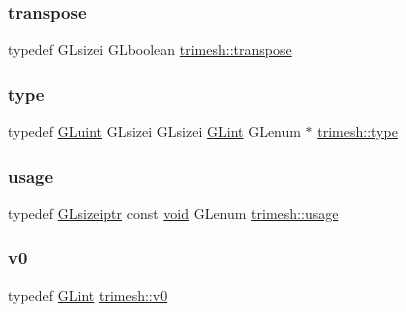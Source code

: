 \subsubsection{\texorpdfstring{transpose}{transpose}}
{\footnotesize\ttfamily typedef G\+Lsizei G\+Lboolean \hyperlink{namespacetrimesh_af31d9992cd459bbcf8e2705cb9b541f4}{trimesh\+::transpose}}

\mbox{\label{namespacetrimesh_aa726c5bf9cff74a26269e8d258ae9e3d}} 
\subsubsection{\texorpdfstring{type}{type}}
{\footnotesize\ttfamily typedef \hyperlink{namespacetrimesh_ad2289423ef47b393854afc30451d433b}{G\+Luint} G\+Lsizei G\+Lsizei \hyperlink{namespacetrimesh_aeccc290e30b317c861fb146956528187}{G\+Lint} G\+Lenum $\ast$ \hyperlink{namespacetrimesh_aa726c5bf9cff74a26269e8d258ae9e3d}{trimesh\+::type}}

\mbox{\label{namespacetrimesh_a1ddaaba06600c3dc8f7557589161162f}} 
\subsubsection{\texorpdfstring{usage}{usage}}
{\footnotesize\ttfamily typedef \hyperlink{namespacetrimesh_a81f1ae6b94117df73fad0a5577fd01a9}{G\+Lsizeiptr} const \hyperlink{namespacetrimesh_a784ddfd979e1c579bda795a8edfc3f43}{void} G\+Lenum \hyperlink{namespacetrimesh_a1ddaaba06600c3dc8f7557589161162f}{trimesh\+::usage}}

\mbox{\label{namespacetrimesh_a240b3c8ea9cf01bd707862b32fa26dff}} 
\subsubsection{\texorpdfstring{v0}{v0}}
{\footnotesize\ttfamily typedef \hyperlink{namespacetrimesh_aeccc290e30b317c861fb146956528187}{G\+Lint} \hyperlink{namespacetrimesh_a240b3c8ea9cf01bd707862b32fa26dff}{trimesh\+::v0}}

\mbox{\label{namespacetrimesh_a02cc42cb0e29e66e5488b53767461f68}} 
